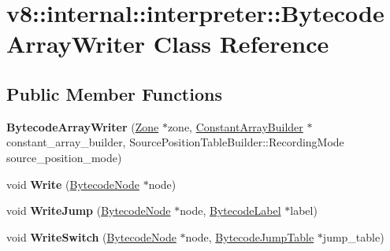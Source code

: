 \hypertarget{classv8_1_1internal_1_1interpreter_1_1BytecodeArrayWriter}{}\section{v8\+:\+:internal\+:\+:interpreter\+:\+:Bytecode\+Array\+Writer Class Reference}
\label{classv8_1_1internal_1_1interpreter_1_1BytecodeArrayWriter}
\subsection*{Public Member Functions}
\begin{DoxyCompactItemize}
\item 
\mbox{\label{classv8_1_1internal_1_1interpreter_1_1BytecodeArrayWriter_a6dbcb850a77552828f544b1dc650ebb7}} 
{\bfseries Bytecode\+Array\+Writer} (\mbox{\hyperlink{classv8_1_1internal_1_1Zone}{Zone}} $\ast$zone, \mbox{\hyperlink{classv8_1_1internal_1_1interpreter_1_1ConstantArrayBuilder}{Constant\+Array\+Builder}} $\ast$constant\+\_\+array\+\_\+builder, Source\+Position\+Table\+Builder\+::\+Recording\+Mode source\+\_\+position\+\_\+mode)
\item 
\mbox{\label{classv8_1_1internal_1_1interpreter_1_1BytecodeArrayWriter_a0757630dc5eae2cb010c0bee292a1f55}} 
void {\bfseries Write} (\mbox{\hyperlink{classv8_1_1internal_1_1interpreter_1_1BytecodeNode}{Bytecode\+Node}} $\ast$node)
\item 
\mbox{\label{classv8_1_1internal_1_1interpreter_1_1BytecodeArrayWriter_a280753471b65f9c6e9b319327ebcf7b7}} 
void {\bfseries Write\+Jump} (\mbox{\hyperlink{classv8_1_1internal_1_1interpreter_1_1BytecodeNode}{Bytecode\+Node}} $\ast$node, \mbox{\hyperlink{classv8_1_1internal_1_1interpreter_1_1BytecodeLabel}{Bytecode\+Label}} $\ast$label)
\item 
\mbox{\label{classv8_1_1internal_1_1interpreter_1_1BytecodeArrayWriter_a24374ffe04555f391282216d50ace79e}} 
void {\bfseries Write\+Switch} (\mbox{\hyperlink{classv8_1_1internal_1_1interpreter_1_1BytecodeNode}{Bytecode\+Node}} $\ast$node, \mbox{\hyperlink{classv8_1_1internal_1_1interpreter_1_1BytecodeJumpTable}{Bytecode\+Jump\+Table}} $\ast$jump\+\_\+table)

\end{DoxyCompactItemize}
